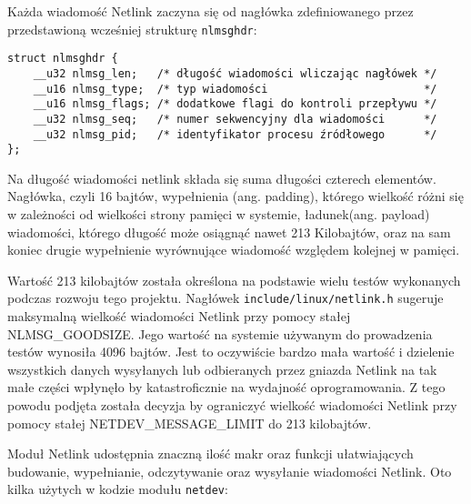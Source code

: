 Każda wiadomość Netlink zaczyna się od nagłówka zdefiniowanego przez
przedstawioną wcześniej strukturę \texttt{nlmsghdr}:

\begin{verbatim}
struct nlmsghdr {
    __u32 nlmsg_len;   /* długość wiadomości wliczając nagłówek */
    __u16 nlmsg_type;  /* typ wiadomości                        */
    __u16 nlmsg_flags; /* dodatkowe flagi do kontroli przepływu */
    __u32 nlmsg_seq;   /* numer sekwencyjny dla wiadomości      */
    __u32 nlmsg_pid;   /* identyfikator procesu źródłowego      */
};
\end{verbatim}

Na długość wiadomości netlink składa się suma długości czterech
elementów. Nagłówka, czyli 16 bajtów, wypełnienia (ang. padding),
którego wielkość różni się w zależności od wielkości strony pamięci w
systemie, ładunek(ang. payload) wiadomości, którego długość może
osiągnąć nawet 213 Kilobajtów, oraz na sam koniec drugie wypełnienie
wyrównujące wiadomość względem kolejnej w pamięci.

Wartość 213 kilobajtów została określona na podstawie wielu testów
wykonanych podczas rozwoju tego projektu. Nagłówek
\texttt{include/linux/netlink.h} sugeruje maksymalną wielkość wiadomości
Netlink przy pomocy stałej NLMSG\_GOODSIZE. Jego wartość na systemie
używanym do prowadzenia testów wynosiła 4096 bajtów. Jest to oczywiście
bardzo mała wartość i dzielenie wszystkich danych wysyłanych lub
odbieranych przez gniazda Netlink na tak małe części wpłynęło by
katastroficznie na wydajność oprogramowania. Z tego powodu podjęta
została decyzja by ograniczyć wielkość wiadomości Netlink przy pomocy
stałej NETDEV\_MESSAGE\_LIMIT do 213 kilobajtów.

Moduł Netlink udostępnia znaczną ilość makr oraz funkcji ułatwiających
budowanie, wypełnianie, odczytywanie oraz wysyłanie wiadomości Netlink.
Oto kilka użytych w kodzie modułu \texttt{netdev}:

